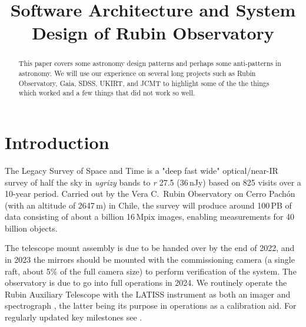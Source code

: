 \documentclass[11pt,twoside]{article}
\begin{document}

\title{Software Architecture and System Design of Rubin Observatory}







\begin{abstract}
This paper covers some astronomy design patterns and perhaps some anti-patterns in astronomy. We will use our experience on several long projects such as Rubin Observatory, Gaia, SDSS,  UKIRT, and JCMT to highlight some of the the things which worked and a few things that did not work so well.
\end{abstract}

\section{Introduction}

The Legacy Survey of Space and Time \citep{2019ApJ...873..111I} is a "deep fast wide" optical/near-IR survey of half the sky in \emph{ugrizy} bands to \emph{r} 27.5 (36\,nJy) based on 825 visits over a 10-year period.
Carried out by the Vera C.\ Rubin Observatory on Cerro Pach\'{o}n (with an altitude of 2647\,m) in Chile, the survey will produce around 100\,PB of data consisting of about a billion 16\,Mpix images, enabling measurements for 40 billion objects.

The telescope mount assembly is due to be handed over by the end of 2022, and in 2023 the mirrors should be mounted with the commissioning camera (a single raft, about 5\% of the full camera size) to perform verification of the system.
The observatory is due to go into full operations in 2024.
We routinely operate the Rubin Auxiliary Telescope with the LATISS instrument as both an imager and spectrograph \citep{2020SPIE11452E..0UI}, the latter being its purpose in operations as a calibration aid.
For regularly updated key milestones see \citet{DMTN-232}.
\end{document}

